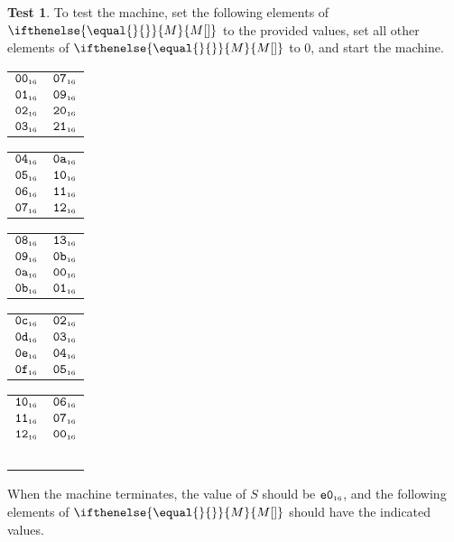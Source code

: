 \documentclass[a4paper,12pt]{article}
\makeatletter
\newcommand{\num}[1]{\texttt{\MakeLowercase{#1}}}
\newcommand{\hex}[1]{\num{#1}_{\textup{\tiny 16}}}
\newcommand{\MEM}[1]{\ifthenelse{\equal{#1}{}}{M}{M[#1]}}
\newcommand{\SP}{S}
\theoremstyle{definition}
\newtheorem{test}{Test}
\newenvironment{memtable}{%
  \begin{trivlist}
    \item
    }{%
    \end{trivlist}}
\newenvironment{memcolumn}{%
  \begin{tabular}{@{}ll@{}}
    \hline}
    {%
    \hline
  \end{tabular}}
\newcommand{\memspace}{\qquad}
\makeatother
\begin{document}
\begin{test}
  To test the machine, set the following elements of $\MEM{}$ to the provided values, set all other elements of $\MEM{}$ to 0, and start the machine.
  \begin{memtable}
    \begin{memcolumn}
      $\hex{00}$ & $\hex{07}$ \\
      $\hex{01}$ & $\hex{09}$ \\
      $\hex{02}$ & $\hex{20}$ \\
      $\hex{03}$ & $\hex{21}$ \\
    \end{memcolumn}
    \memspace
    \begin{memcolumn}
      $\hex{04}$ & $\hex{0A}$ \\
      $\hex{05}$ & $\hex{10}$ \\
      $\hex{06}$ & $\hex{11}$ \\
      $\hex{07}$ & $\hex{12}$ \\
    \end{memcolumn}
    \memspace
    \begin{memcolumn}
      $\hex{08}$ & $\hex{13}$ \\
      $\hex{09}$ & $\hex{0B}$ \\
      $\hex{0A}$ & $\hex{00}$ \\
      $\hex{0B}$ & $\hex{01}$ \\
    \end{memcolumn}
    \memspace
    \begin{memcolumn}
      $\hex{0C}$ & $\hex{02}$ \\
      $\hex{0D}$ & $\hex{03}$ \\
      $\hex{0E}$ & $\hex{04}$ \\
      $\hex{0F}$ & $\hex{05}$ \\
    \end{memcolumn}
    \memspace
    \begin{memcolumn}
      $\hex{10}$ & $\hex{06}$ \\
      $\hex{11}$ & $\hex{07}$ \\
      $\hex{12}$ & $\hex{00}$ \\
      ~\\
    \end{memcolumn}
  \end{memtable}
  When the machine terminates, the value of $\SP$ should be $\hex{E0}$, and the following elements of $\MEM{}$ should have the indicated values.
  \begin{memtable}

\end{memtable}
\end{test}
\end{document}
